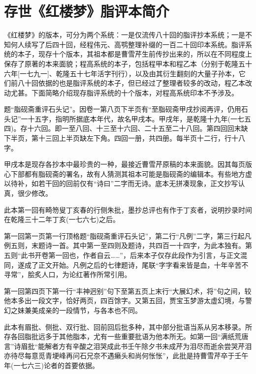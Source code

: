 
\chapter{存世《红楼梦》脂评本简介}

《红楼梦》的版本，可分为两个系统：一是仅流传八十回的脂评抄本系统；一是不知何人续写了后四十回，经程伟元、高鹗整理补缀的一百二十回印本系统。脂评系统的本子，现存十个版本，其祖本都是曹雪芹生前传抄出来的，所以在不同程度上保存了原著的本来面貌；程高系统的本子，包括程甲本和程乙本（分别于乾隆五十六年{[}一七九一{]}、乾隆五十七年活字刊行），以及由其衍生翻刻的大量子孙本，它们前八十回依据的也是脂评系统的本子，但已经过了整理者较多的改动，程乙本改动尤甚。下面简略介绍现存脂评系统的十个版本，对程高系统印本不予涉及。

{ }

题``脂砚斋重评石头记''。因卷一第八页下半页有``至脂砚斋甲戌抄阅再评，仍用石头记''一十五字，指明所据底本年代，故名甲戌本。甲戌年，是乾隆十九年(一七五四)。存十六回。即一至八回、十三至十六回、二十五至二十八回。第四回回末缺下半页，第十三回上半页缺左下角。四回一册，共四册。每半页十二行，行十八字。

甲戌本是现存各抄本中最珍贵的一种，最接近曹雪芹原稿的本来面貌。因其每页版心下部都有脂砚斋的署名，故有人猜测其祖本可能是脂砚斋的编辑本。有些地方虚以待补，如若干回的回前仅有``诗曰''二字而无诗。底本无拼凑现象，正文抄写认真，很少修改。

此本第一回有畸笏叟丁亥春的行侧朱批，墨抄总评也有作于丁亥者，说明抄录时间在乾隆三十二年丁亥(一七六七)之后。

第一回第一页第一行顶格题``脂砚斋重评石头记''，第二行``凡例''二字，第三行起凡例五则，末题诗一首。其中第一至四则及题诗，共四百一十四字，为此本独有。第五则``此书开卷第一回也，作者自云\ldots{}\ldots{}''，后来本子仅存此段作为引言，与正文混同，遂成了正文开始。凡例之后的七律题诗，尾联``字字看来皆是血，十年辛苦不寻常''，脍炙人口，为论红著作所常引用。

第一回第四页下第一行``丰神迥别''句下至第五页上末行``大展幻术，将''句之间，较他本多出一段文字，恰好两页，四百馀字。又第五回，贾宝玉梦游太虚幻境，与警幻之妹兼美成亲的一段情节，与各本也不同。

此本有眉批、侧批、双行批、回前回后批多种，其中部分批语当系从另本移录。所存各回脂批远多于其他脂本，尤有一些重要批语为他本所无。如第一回``满纸荒唐言''诗眉批``能解者方有辛酸之泪哭成此书壬午除夕书未成芹为泪尽而逝余尝哭芹泪亦待尽每意觅青埂峰再问石兄奈不遇癞头和尚何怅怅''，此批是持曹雪芹卒于壬午年(一七六三)论者的首要依据。

